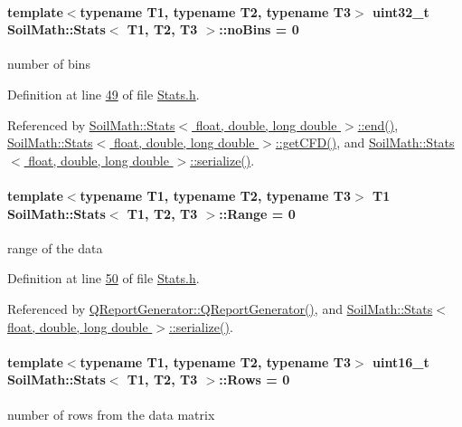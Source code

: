 \paragraph[{no\+Bins}]{\setlength{\rightskip}{0pt plus 5cm}template$<$typename T1, typename T2, typename T3$>$ {\bf uint32\+\_\+t} {\bf Soil\+Math\+::\+Stats}$<$ T1, T2, T3 $>$\+::no\+Bins = 0}\label{class_soil_math_1_1_stats_a4202c9085eacaff2e04eda84fc90e92b}
number of bins 

Definition at line \hyperlink{_stats_8h_source_l00049}{49} of file \hyperlink{_stats_8h_source}{Stats.\+h}.



Referenced by \hyperlink{_stats_8h_source_l00066}{Soil\+Math\+::\+Stats$<$ float, double, long double $>$\+::end()}, \hyperlink{_stats_8h_source_l00629}{Soil\+Math\+::\+Stats$<$ float, double, long double $>$\+::get\+C\+F\+D()}, and \hyperlink{_stats_8h_source_l00651}{Soil\+Math\+::\+Stats$<$ float, double, long double $>$\+::serialize()}.

\hypertarget{class_soil_math_1_1_stats_a7154ac6c97dc2e83bdff7fef3cbdac5b}{}
\paragraph[{Range}]{\setlength{\rightskip}{0pt plus 5cm}template$<$typename T1, typename T2, typename T3$>$ T1 {\bf Soil\+Math\+::\+Stats}$<$ T1, T2, T3 $>$\+::Range = 0}\label{class_soil_math_1_1_stats_a7154ac6c97dc2e83bdff7fef3cbdac5b}
range of the data 

Definition at line \hyperlink{_stats_8h_source_l00050}{50} of file \hyperlink{_stats_8h_source}{Stats.\+h}.



Referenced by \hyperlink{qreportgenerator_8cpp_source_l00004}{Q\+Report\+Generator\+::\+Q\+Report\+Generator()}, and \hyperlink{_stats_8h_source_l00651}{Soil\+Math\+::\+Stats$<$ float, double, long double $>$\+::serialize()}.

\hypertarget{class_soil_math_1_1_stats_a0e462c013f12f02e31e9ae03334151c3}{}
\paragraph[{Rows}]{\setlength{\rightskip}{0pt plus 5cm}template$<$typename T1, typename T2, typename T3$>$ uint16\+\_\+t {\bf Soil\+Math\+::\+Stats}$<$ T1, T2, T3 $>$\+::Rows = 0}\label{class_soil_math_1_1_stats_a0e462c013f12f02e31e9ae03334151c3}
number of rows from the data matrix 

